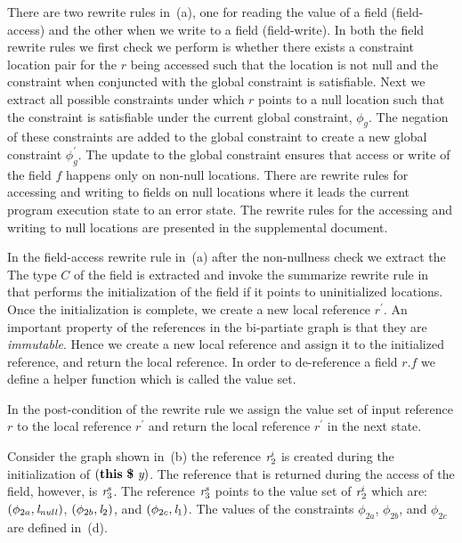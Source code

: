 There are two rewrite rules in~(a), one for reading
the value of a field (field-access) and the other when we write to a
field (field-write). In both the field rewrite rules we first check we
perform is whether there exists a constraint location pair for the $r$
being accessed such that the location is not null and the constraint
when conjuncted with the global constraint is satisfiable. Next we
extract all possible constraints under which $r$ points to a null
location such that the constraint is satisfiable under the current
global constraint, $\phi_g$. The negation of these constraints are
added to the global constraint to create a new global constraint
$\phi_g^\prime$. The update to the global constraint ensures that
access or write of the field $f$ happens only on non-null
locations. There are rewrite rules for accessing and writing to fields
on null locations where it leads the current program execution state
to an error state. The rewrite rules for the accessing and writing to
null locations are presented in the supplemental document.

In the field-access rewrite rule in~(a) after the
non-nullness check we extract the The type $C$ of the field is
extracted and invoke the summarize rewrite rule
in~ that performs the initialization of the field
if it points to uninitialized locations. Once the initialization is
complete, we create a new local reference $r^\prime$. An important
property of the references in the bi-partiate graph is that they are
\emph{immutable}. Hence we create a new local reference and assign it
to the initialized reference, and return the local reference. In order
to de-reference a field $r.f$ we define a helper function which is
called the value set.



In the post-condition of the rewrite rule we assign
the value set of input reference $r$ to the local reference $r^\prime$
and return the local reference $r^\prime$ in the next state.

Consider the graph shown in~(b) the reference
$\emph{r}_2^i$ is created during the initialization of $\lp\cfgt{this}\  \cfgt{\$}\ \cfgnt{y}\rp$. The
reference that is returned during the access of the field, however, is
$\emph{r}_3^s$. The reference $\emph{r}_3^s$ points to the value set of $\emph{r}_2^i$
which are: $(\phi_{2a}, \emph{l}_\mathit{null})$, $(\phi_{2b}, \emph{l}_2)$, and
$(\phi_{2c}, \emph{l}_1)$. The values of the constraints $\phi_{2a}$,
$\phi_{2b}$, and $\phi_{2c}$ are defined in~(d).

